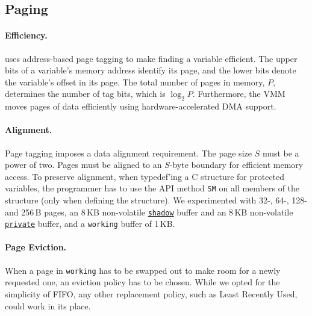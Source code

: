 \subsection{Paging}
\label{sec:impl:paging}


\paragraph{Efficiency.}
\sys uses address-based page tagging to make finding a variable efficient.  The
upper bits of a variable's memory address identify its page, and the lower bits
denote the variable's offset in its page. The total number of pages in memory,
$P$, determines the number of tag bits, which is $\log_2 P$.
%
Furthermore, the VMM moves pages of data efficiently using hardware-accelerated DMA support.

\paragraph{Alignment.}
Page tagging imposes a data alignment requirement.
The page size $S$ must be a power of two. 
%
Pages must be aligned to an $S$-byte boundary for efficient memory access. 
%
To preserve alignment, when typedef'ing a C structure for protected variables, the programmer has to use the API method \texttt{SM} on all members of the structure (only when defining the structure).
%
We experimented with 32-, 64-, 128- and 256\,B pages, an 8\,KB non-volatile \texttt{\underline{shadow}} buffer and
an 8\,KB non-volatile \texttt{\underline{private}} buffer, and a \texttt{working} buffer
of 1\,KB.

\paragraph{Page Eviction.}
When a page in \texttt{working} has to be swapped out to make room for a newly requested one, an eviction policy has to be chosen.
While we opted for the simplicity of FIFO, any other replacement policy, such as Least Recently Used, could work in its place.

